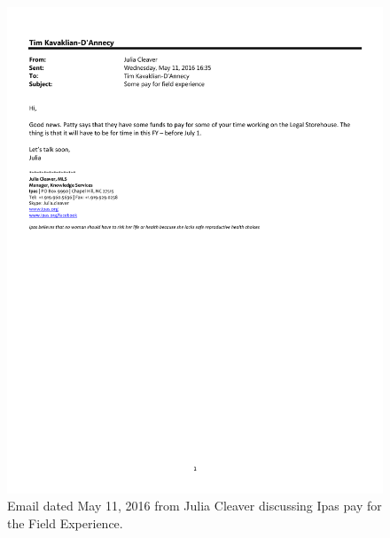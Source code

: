 \begin{figure}
   \centering
        \noindent\includegraphics[page=1,angle=-90,origin=c,width=.75\textwidth,height=.75\textheight]{documents/2016-05-11-Email-Julia-Cleaver.pdf}
 \caption{Email dated May 11, 2016 from Julia Cleaver discussing Ipas pay for the Field Experience.}
 \label{fig:2016-05-11-Email-Julia-Cleaver}
\end{figure}

